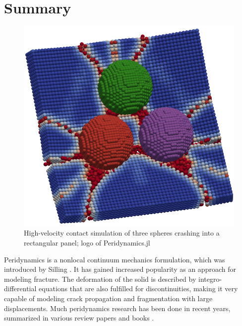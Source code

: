 \documentclass{juliacon}
\begin{document}


\maketitle

\section{Summary}

\begin{figure}
\centerline{\includegraphics[width=0.8\linewidth]{logo.png}}
\caption{High-velocity contact simulation of three spheres crashing into a rectangular panel; logo of Peridynamics.jl}
\label{fig:logo}
\end{figure}

Peridynamics is a nonlocal continuum mechanics formulation, which was introduced by Silling \cite{Silling2000}.
It has gained increased popularity as an approach for modeling fracture.
The deformation of the solid is described by integro-differential equations that are also fulfilled for discontinuities, making it very capable of modeling crack propagation and fragmentation with large displacements.
Much peridynamics research has been done in recent years, summarized in various review papers and books \cite{Diehl2019,Javili2019Review,Madenci2014}.
\end{document}
